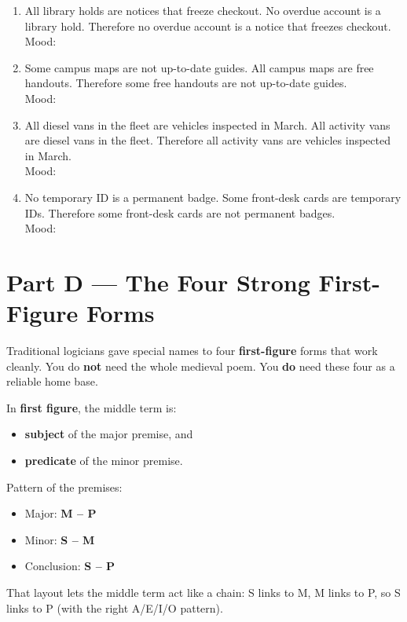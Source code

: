 \documentclass[11pt]{article}
\begin{document}
\begin{enumerate}
\item All library holds are notices that freeze checkout. No overdue account is a library hold. Therefore no overdue account is a notice that freezes checkout.\\
Mood: \underline{\hspace{1.0in}}

\item Some campus maps are not up-to-date guides. All campus maps are free handouts. Therefore some free handouts are not up-to-date guides.\\
Mood: \underline{\hspace{1.0in}}

\item All diesel vans in the fleet are vehicles inspected in March. All activity vans are diesel vans in the fleet. Therefore all activity vans are vehicles inspected in March.\\
Mood: \underline{\hspace{1.0in}}

\item No temporary ID is a permanent badge. Some front-desk cards are temporary IDs. Therefore some front-desk cards are not permanent badges.\\
Mood: \underline{\hspace{1.0in}}
\end{enumerate}

\newpage
\section*{Part D --- The Four Strong First-Figure Forms}
\noindent Traditional logicians gave special names to four \textbf{first-figure} forms that work cleanly. You do \textbf{not} need the whole medieval poem. You \textbf{do} need these four as a reliable home base.

\vspace{0.15em}
\noindent In \textbf{first figure}, the middle term is:
\begin{itemize}
\item \textbf{subject} of the major premise, and
\item \textbf{predicate} of the minor premise.
\end{itemize}
Pattern of the premises:
\begin{itemize}
\item Major: \textbf{M -- P}
\item Minor: \textbf{S -- M}
\item Conclusion: \textbf{S -- P}
\end{itemize}
That layout lets the middle term act like a chain: S links to M, M links to P, so S links to P (with the right A/E/I/O pattern).
\end{document}
